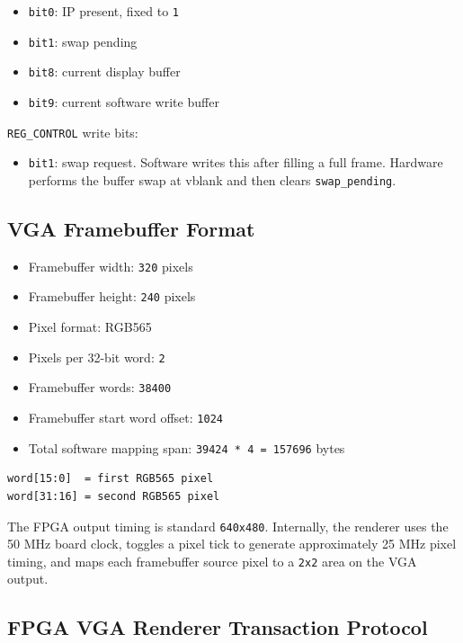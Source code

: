 \documentclass[12pt,a4paper]{article}
\begin{document}
\begin{itemize}
  \item \texttt{bit0}: IP present, fixed to \texttt{1}
  \item \texttt{bit1}: swap pending
  \item \texttt{bit8}: current display buffer
  \item \texttt{bit9}: current software write buffer
\end{itemize}

\noindent \texttt{REG\_CONTROL} write bits:

\begin{itemize}
  \item \texttt{bit1}: swap request. Software writes this after filling a full
  frame. Hardware performs the buffer swap at vblank and then clears
  \texttt{swap\_pending}.
\end{itemize}

\subsection{VGA Framebuffer Format}

\begin{itemize}
  \item Framebuffer width: \texttt{320} pixels
  \item Framebuffer height: \texttt{240} pixels
  \item Pixel format: RGB565
  \item Pixels per 32-bit word: \texttt{2}
  \item Framebuffer words: \texttt{38400}
  \item Framebuffer start word offset: \texttt{1024}
  \item Total software mapping span: \texttt{39424 * 4 = 157696} bytes
\end{itemize}

\begin{lstlisting}[style=fighterstyle]
word[15:0]  = first RGB565 pixel
word[31:16] = second RGB565 pixel
\end{lstlisting}

The FPGA output timing is standard \texttt{640x480}. Internally, the renderer
uses the 50 MHz board clock, toggles a pixel tick to generate approximately
25 MHz pixel timing, and maps each framebuffer source pixel to a \texttt{2x2}
area on the VGA output.

\subsection{FPGA VGA Renderer Transaction Protocol}
\end{document}

